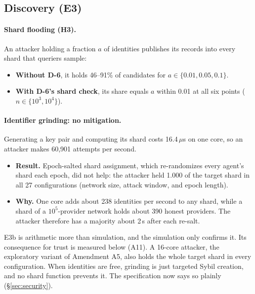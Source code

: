 \subsection{Discovery (E3)}
\label{sec:eval-discovery}
\paragraph{Shard flooding (H3).}
An attacker holding a fraction $a$ of identities publishes its records
into every shard that queriers sample:
\begin{itemize}
\item \textbf{Without D-6}, it holds 46--91\% of candidates for
  $a\in\{0.01,0.05,0.1\}$.
\item \textbf{With D-6's shard check}, its share equals $a$ within 0.01
  at all six points ($n\in\{10^3,10^4\}$).
\end{itemize}

\paragraph{Identifier grinding: no mitigation.}
Generating a key pair and computing its shard costs 16.4\,$\mu$s on one
core, so an attacker makes 60,901 attempts per second.
\begin{itemize}
\item \textbf{Result.} Epoch-salted shard assignment, which re-randomizes
  every agent's shard each epoch, did not help: the attacker held
  1.000 of the target shard in all 27 configurations
  (network size, attack window, and epoch length).
\item \textbf{Why.} One core adds about 238 identities per second to any
  shard, while a shard of a $10^5$-provider network holds about 390
  honest providers. The attacker therefore has a majority about 2\,s
  after each re-salt.
\end{itemize}
E3b is arithmetic more than simulation, and the simulation only confirms
it. Its consequence for trust is measured below (A11).
A 16-core attacker, the exploratory variant of Amendment A5, also holds
the whole target shard in every configuration. When identities are free,
grinding is just targeted Sybil creation, and no shard function prevents
it. The specification now says so plainly (\S\ref{sec:security}).

